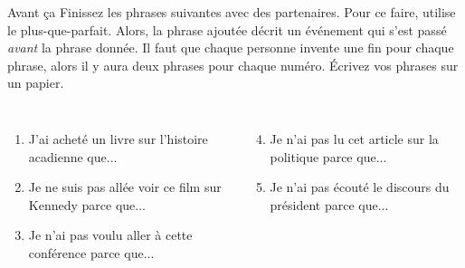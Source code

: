 \begin{frame}{Avant ça}
  Finissez les phrases suivantes avec des partenaires.
  Pour ce faire, \alert{utilise le plus-que-parfait}.
  Alors, la phrase ajoutée décrit un événement qui s'est passé \emph{avant} la phrase donnée.
  Il faut que chaque personne invente une fin pour chaque phrase, alors il y aura \alert{deux} phrases pour chaque numéro.
  Écrivez vos phrases sur un papier.
  \vspace{0.25cm}
  \begin{columns}[t]
      \begin{enumerate}
        \item J'ai acheté un livre sur l'histoire acadienne que...
        \item Je ne suis pas allée voir ce film sur Kennedy parce que...
        \item Je n'ai pas voulu aller à cette conférence parce que...
      \end{enumerate}
      \begin{enumerate}
        \setcounter{enumi}{3}
        \item Je n'ai pas lu cet article sur la politique parce que...
        \item Je n'ai pas écouté le discours du président parce que...
      \end{enumerate}
  \end{columns}
\end{frame}